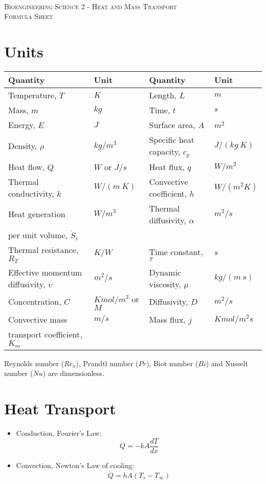 \documentclass[12pt,a4paper]{article}
\begin{document}
\ \\
\textsc{\large{
Bioengineering Science 2  - Heat and Mass Transport}}\\
\textsc{\large{Formula Sheet}}

\section{Units}
\begin{table}[H] \centering
\begin{tabular}{|l|l|l|l|}
\hline
\textbf{Quantity} & \textbf{Unit} & \textbf{Quantity} & \textbf{Unit} \\ \hline
Temperature, $T$ & $K$ & Length, $L$ & $m$ \\ \hline
Mass, $m$ & $kg$ & Time, $t$ & $s$ \\ \hline
Energy, $E$ & $J$ & Surface area, $A$ & $m^{2}$ \\ \hline
Density, $\rho$ & $kg/m^{3}$ & Specific heat capacity, $c_{p}$ & $J/(kg \ K)$ \\ \hline
Heat flow, $Q$ & $W$ or $J/s$  & Heat flux, $q$ & $W/m^{2}$ \\ \hline
Thermal conductivity, $k$ & $W/(m\ K)$ & Convective coefficient, $h$ & $W/(m^{2}K)$ \\ \hline
Heat generation  & $W/m^{3}$ & Thermal diffusivity, $\alpha$ & $m^{2}/s$ \\ 
per unit volume, $\dot{S}_{v}$ &&& \\ \hline
Thermal resistance, $R_{T}$ & $K/W$ & Time constant, $\tau$ & $s$ \\ \hline
Effective momentum diffusivity, $\upsilon$ & $m^{2}/s$ & Dynamic viscosity, $\mu$ & $kg/(m\ s)$ \\ \hline \hline
Concentration, $C$ & $Kmol/m^{3}$ or $M$ & Diffusivity, $D$ & $m^{2}/s$ \\ \hline 
Convective mass & $m/s$ & Mass flux, $j$ & $Kmol/m^{2}s$ \\ 
transport coefficient, $K_{m}$ &&& \\ \hline
\end{tabular}
\end{table}
Reynolds number ($Re_{x}$), Prandtl number ($Pr$), Biot number ($Bi$) and Nusselt number ($Nu$) are dimensionless.

\section{Heat Transport}
\begin{itemize}

	\item Conduction, Fourier's Law: \[\dot{Q}=-kA\frac{dT}{dx}\]
	
	\item Convection, Newton's Law of cooling: \[\dot{Q}=hA(T_{s}-T_{\infty})\]

\end{itemize}
\end{document}
